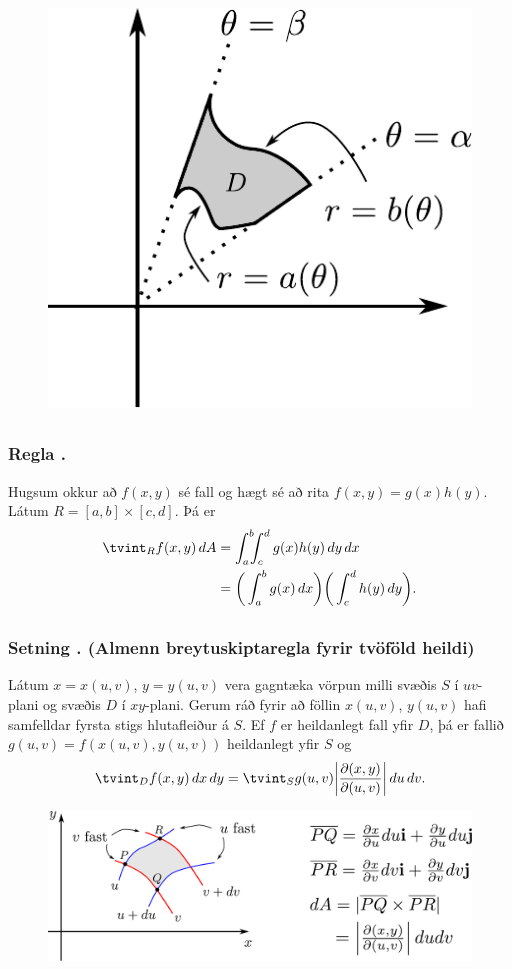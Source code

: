 \begin {figure}[h!]
 \centering
            \includegraphics[width=0.35\linewidth]{polarsvaedi}
\end {figure}



\subsection{} 

\subsubsection{Regla \kaflanr.}
Hugsum okkur að $f(x,y)$ sé fall og hægt sé að rita
$f(x,y)=g(x)h(y)$.  Látum $R=[a,b]\times [c,d]$.  Þá er 
\begin{align*}
\tvint_R f(x,y)\,dA&=\int_a^b\!\!\!\int_{c}^{d}g(x)h(y)\,dy\, dx\\
&=\bigg(\int_a^b g(x)\,dx\bigg)\bigg(\int_c^d h(y)\,dy\bigg).
\end{align*}





\subsection{} 

\subsubsection{Setning \kaflanr. (Almenn breytuskiptaregla fyrir tvöföld heildi)}

Látum $x=x(u,v)$, $y=y(u,v)$ vera gagntæka vörpun milli svæðis $S$ í
$uv$-plani og svæðis $D$ í $xy$-plani.  Gerum ráð fyrir að föllin  
$x(u,v)$, $y(u,v)$ hafi samfelldar fyrsta stigs hlutafleiður á $S$.  Ef
$f$ er heildanlegt fall yfir $D$, þá er fallið $g(u,v)=f(x(u,v), y(u,v))$
heildanlegt yfir $S$ og 
$$\tvint_D f(x,y)\,dx\,dy=\tvint_S g(u,v)
\bigg|\frac{\partial(x,y)}{\partial(u,v)}\bigg|\,du\,dv.$$

\begin {figure}[h!]
 \centering
            \includegraphics[width=0.85\linewidth]{changevar}
\end {figure}




